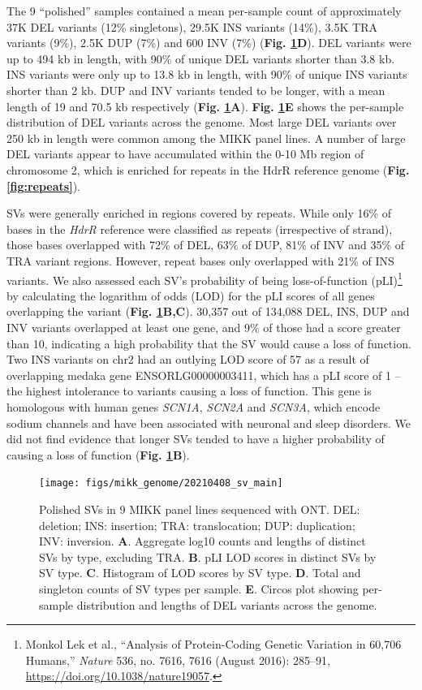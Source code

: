 \documentclass[
  9pt,
]{book}
\begin{document}
The 9 ``polished'' samples contained a mean per-sample count of approximately 37K DEL variants (12\% singletons), 29.5K INS variants (14\%), 3.5K TRA variants (9\%), 2.5K DUP (7\%) and 600 INV (7\%) (\textbf{Fig. \ref{fig:SV-main}D}). DEL variants were up to 494 kb in length, with 90\% of unique DEL variants shorter than 3.8 kb. INS variants were only up to 13.8 kb in length, with 90\% of unique INS variants shorter than 2 kb. DUP and INV variants tended to be longer, with a mean length of 19 and 70.5 kb respectively (\textbf{Fig. \ref{fig:SV-main}A}). \textbf{Fig. \ref{fig:SV-main}E} shows the per-sample distribution of DEL variants across the genome. Most large DEL variants over 250 kb in length were common among the MIKK panel lines. A number of large DEL variants appear to have accumulated within the 0-10 Mb region of chromosome 2, which is enriched for repeats in the HdrR reference genome (\textbf{Fig. \ref{fig:repeats}}).

SVs were generally enriched in regions covered by repeats. While only 16\% of bases in the \emph{HdrR} reference were classified as repeats (irrespective of strand), those bases overlapped with 72\% of DEL, 63\% of DUP, 81\% of INV and 35\% of TRA variant regions. However, repeat bases only overlapped with 21\% of INS variants. We also assessed each SV's probability of being loss-of-function (pLI)\footnote{Monkol Lek et al., {``Analysis of Protein-Coding Genetic Variation in 60,706 Humans,''} \emph{Nature} 536, no. 7616, 7616 (August 2016): 285--91, \url{https://doi.org/10.1038/nature19057}.} by calculating the logarithm of odds (LOD) for the pLI scores of all genes overlapping the variant (\textbf{Fig. \ref{fig:SV-main}B,C}). 30,357 out of 134,088 DEL, INS, DUP and INV variants overlapped at least one gene, and 9\% of those had a score greater than 10, indicating a high probability that the SV would cause a loss of function. Two INS variants on chr2 had an outlying LOD score of 57 as a result of overlapping medaka gene ENSORLG00000003411, which has a pLI score of 1 -- the highest intolerance to variants causing a loss of function. This gene is homologous with human genes \emph{SCN1A}, \emph{SCN2A} and \emph{SCN3A}, which encode sodium channels and have been associated with neuronal and sleep disorders. We did not find evidence that longer SVs tended to have a higher probability of causing a loss of function (\textbf{Fig. \ref{fig:SV-main}B}).



\begin{figure}
\texttt{[image: figs/mikk\_genome/20210408\_sv\_main]} \caption{Polished SVs in 9 MIKK panel lines sequenced with ONT. DEL: deletion; INS: insertion; TRA: translocation; DUP: duplication; INV: inversion. \textbf{A}. Aggregate log10 counts and lengths of distinct SVs by type, excluding TRA. \textbf{B}. pLI LOD scores in distinct SVs by SV type. \textbf{C}. Histogram of LOD scores by SV type. \textbf{D}. Total and singleton counts of SV types per sample. \textbf{E}. Circos plot showing per-sample distribution and lengths of DEL variants across the genome.}\label{fig:SV-main}
\end{figure}
\end{document}
